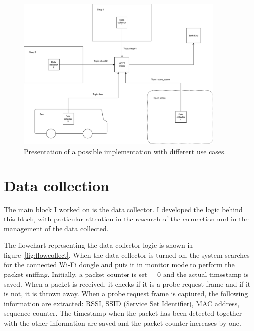 \begin{figure}[h]
\centering 
\includegraphics[width=0.9\textwidth]{images/excases} 
\caption{Presentation of a possible implementation with different use cases.}
\label{fig:excases}
\end{figure}


\section{Data collection}
\label{sec:collection}
\vspace{0.2 cm} 

The main block I worked on is the data collector. I developed the logic behind this block, with particular attention in the research of the connection and in the management of the data collected.

The flowchart representing the data collector logic is shown in figure~\ref{fig:flowcollect}. When the data collector is turned on, the system searches for the connected Wi-Fi dongle and puts it in monitor mode to perform the packet sniffing. Initially, a packet counter is set = 0 and the actual timestamp is saved. When a packet is received, it checks if it is a probe request frame and if it is not, it is thrown away.
When a probe request frame is captured, the following information are extracted: RSSI, SSID (Service Set Identifier), MAC address, sequence counter. The timestamp when the packet has been detected together with the other information are saved and the packet counter increases by one.

